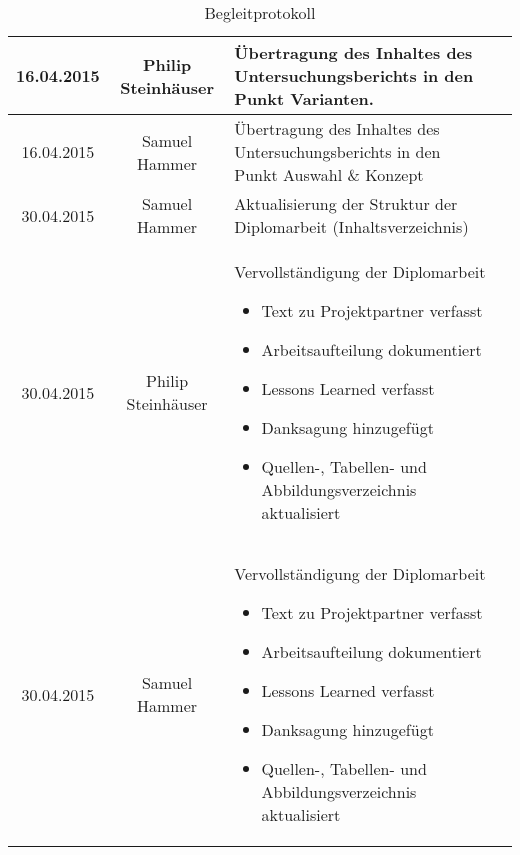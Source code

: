 \begin{table}
\begin{tabular}{| c | c | p{6cm} | p{4cm} |}
		16.04.2015
		&%
		Philip Steinhäuser
		&%
		Übertragung des Inhaltes des Untersuchungsberichts in den Punkt Varianten.
		&%
		\\\hline %
		16.04.2015
		&%
		Samuel Hammer
		&%
		Übertragung des Inhaltes des Untersuchungsberichts in den Punkt Auswahl \& Konzept
		&%
		\\\hline %
		30.04.2015
		&%
		Samuel Hammer
		&%
		Aktualisierung der Struktur der Diplomarbeit (Inhaltsverzeichnis)
		&%
		\\\hline %
		30.04.2015
		&%
		Philip Steinhäuser
		&%
		Vervollständigung der Diplomarbeit
		\begin{itemize}
			\item Text zu Projektpartner verfasst
			\item Arbeitsaufteilung dokumentiert
			\item Lessons Learned verfasst
			\item Danksagung hinzugefügt
			\item Quellen-, Tabellen- und Abbildungsverzeichnis aktualisiert
		\end{itemize}
		&%
		\\\hline %
		30.04.2015
		&%
		Samuel Hammer
		&%
		Vervollständigung der Diplomarbeit
		\begin{itemize}
			\item Text zu Projektpartner verfasst
			\item Arbeitsaufteilung dokumentiert
			\item Lessons Learned verfasst
			\item Danksagung hinzugefügt
			\item Quellen-, Tabellen- und Abbildungsverzeichnis aktualisiert
		\end{itemize}
		&%
		\\\hline %
	\end{tabular}
	\caption{Begleitprotokoll}
\end{table}